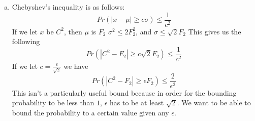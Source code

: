 \documentclass{article}
\theoremstyle{casestyle}
\begin{document}
\begin{enumerate}[a)]
\begin{align*}
))^2 \right] + 3\sum_{i\neq j}E\left[ (a_iH(x_i))^2(a_jH(x_j))^2 \right] \\ &\leq 3(\sum_{i=1}^nE\left[ (a_iH(x_i))^2 \right])^2
\end{align*}
where the last step follows since $\sum_{i=j}E\left[ (a_iH(x_i))^2(a_jH(x_j
  ))^2 \right] + \sum_{i\neq j}E\left[ (a_iH(x_i))^2(a_jH(x_j))^2 \right] = (\sum_{i=1}^nE\left[ (a_iH(x_i))^2 \right])^2$ due to 4-independence of $\mathscr{H}$ and $a$. This bound is similar to the one in lecture 12. We can then continue to simplify:
\begin{align*}
  3(\sum_{i=1}^nE\left[ (a_iH(x_i))^2 \right])^2 &= 3(\sum_{i=1}^nE\left[ a_i^2 \right])^2 \\
                                                &= 3(\sum_{i=1}^n(a_i^2))^2 \\
                                                &= 3F_2^2
\end{align*}
Taking it back to the original expression, we have
\begin{align*}
  \mathrm{Var}(C^2) &= E\left[ C^4 \right] - F_2^2 \\
                    &\leq 3F_2^2-F_2^2\\
                    &= 2F_2^2 
\end{align*}

\item Chebyshev's inequality is as follows: \[
    Pr \left(\left|x-\mu\right| \geq c\sigma \right) \leq \frac{1}{c^2}
  \] If we let $x$ be $C^2$, then $\mu$ is $F_2$ $\sigma^2 \leq 2F_2^2$, and $\sigma \leq \sqrt{2}F_2$ This gives us the following \[
    Pr \left(\left|C^2-F_2\right| \geq c\sqrt{2}F_2 \right) \leq \frac{1}{c^2}
  \] If we let $c=\frac{\epsilon}{\sqrt{2}}$ we have \[
    Pr \left(\left|C^2-F_2\right| \geq \epsilon F_2 \right) \leq \frac{2}{\epsilon^2}
  \] This isn't a particularly useful bound because in order for the bounding probability to be less than $1$, $\epsilon$ has to be at least $\sqrt{2}$. We want to be able to bound the probability to a certain value given any $\epsilon$.


\end{enumerate}
\end{document}
